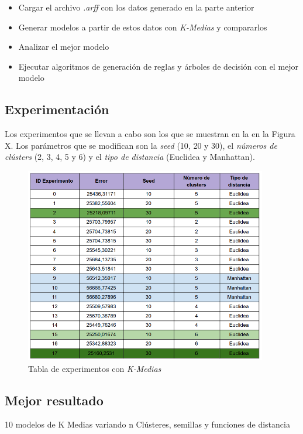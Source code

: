 \documentclass[12pt,a4paper, xcolor=table]{article}
\begin{document}
\begin{itemize}
    \item Cargar el archivo \textit{.arff} con los datos generado en la parte anterior
    \item Generar modelos a partir de estos datos con \textit{K-Medias} y compararlos
    \item Analizar el mejor modelo
    \item Ejecutar algoritmos de generación de reglas y árboles de decisión con el mejor modelo
\end{itemize}


\subsection{Experimentación}

Los experimentos que se llevan a cabo son los que se muestran en la en la Figura X. Los parámetros que se modifican son la \textit{seed} (10, 20 y 30), el \textit{números de clústers} (2, 3, 4, 5 y 6) y el \textit{tipo de distancia} (Euclidea y Manhattan).

\begin{figure}[h]
    \centering
    \includegraphics[width=400px]{img/experimentos.png}
    \captionsetup{labelformat=empty}
    \caption{Tabla de experimentos con \textit{K-Medias}}
\end{figure}


\subsection{Mejor resultado}



 10 modelos de K Medias variando n Clústeres, semillas y funciones de distancia
\end{document}
